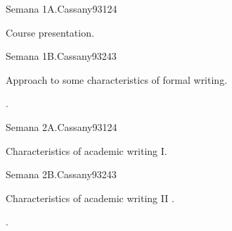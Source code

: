 \begin{syllabus}
\begin{competences}
    \item {}
    \item {}
    \item {}
\end{competences}


\begin{unit}{}{Semana 1A.}{Cassany93}{12}{4}
   \begin{topics}
      \item Course presentation.
   \end{topics}
   \begin{learningoutcomes}
      \item
   \end{learningoutcomes}
\end{unit}

\begin{unit}{}{Semana 1B.}{Cassany93}{24}{3}
   \begin{topics}
      \item Approach to some characteristics of formal writing.
   \end{topics}

   \begin{learningoutcomes}
      \item .
      \end{learningoutcomes}
\end{unit}

\begin{unit}{}{Semana 2A.}{Cassany93}{12}{4}
   \begin{topics}
      \item Characteristics of academic writing I.
   \end{topics}
   \begin{learningoutcomes}
      \item 
   \end{learningoutcomes}
\end{unit}

\begin{unit}{}{Semana 2B.}{Cassany93}{24}{3}
   \begin{topics}
      \item Characteristics of academic writing  II .
   \end{topics}

   \begin{learningoutcomes}
      \item . 
      \end{learningoutcomes}
\end{unit}


\end{syllabus}
